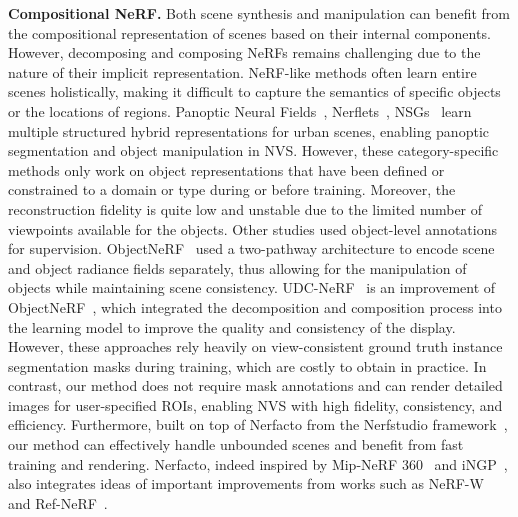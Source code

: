 \textbf{Compositional NeRF.} Both scene synthesis and manipulation can benefit from the compositional representation of scenes based on their internal components. However, decomposing and composing NeRFs remains challenging due to the nature of their implicit representation. NeRF-like methods often learn entire scenes holistically, making it difficult to capture the semantics of specific objects or the locations of regions.
Panoptic Neural Fields~\cite{Kundu_2022_CVPR}, Nerflets~\cite{zhang2022nerfusion}, NSGs~\cite{Ost_2021_CVPR} learn multiple structured hybrid representations for urban scenes, enabling panoptic segmentation and object manipulation in NVS.
However, these category-specific methods only work on object representations that have been defined or constrained to a domain or type during or before training.
Moreover, the reconstruction fidelity is quite low and unstable due to the limited number of viewpoints available for the objects.
Other studies used object-level annotations for supervision.
ObjectNeRF~\cite{yang2021objectnerf} used a two-pathway architecture to encode scene and object radiance fields separately, thus allowing for the manipulation of objects while maintaining scene consistency.
UDC-NeRF~\cite{wang2023udcnerf} is an improvement of ObjectNeRF~\cite{yang2021objectnerf}, which integrated the decomposition and composition process into the learning model to improve the quality and consistency of the display.
However, these approaches rely heavily on view-consistent ground truth instance segmentation masks during training, which are costly to obtain in practice.
In contrast, our method does not require mask annotations and can render detailed images for user-specified ROIs, enabling NVS with high fidelity, consistency, and efficiency. 
Furthermore, built on top of Nerfacto from the Nerfstudio framework~\cite{nerfstudio}, our method can effectively handle unbounded scenes and benefit from fast training and rendering. 
Nerfacto, indeed inspired by Mip-NeRF 360~\cite{barron2022mipnerf360} and iNGP~\cite{mueller2022instant}, also integrates ideas of important improvements from works such as NeRF-W~\cite{martinbrualla2020nerfw} and Ref-NeRF~\cite{verbin2022refnerf}.